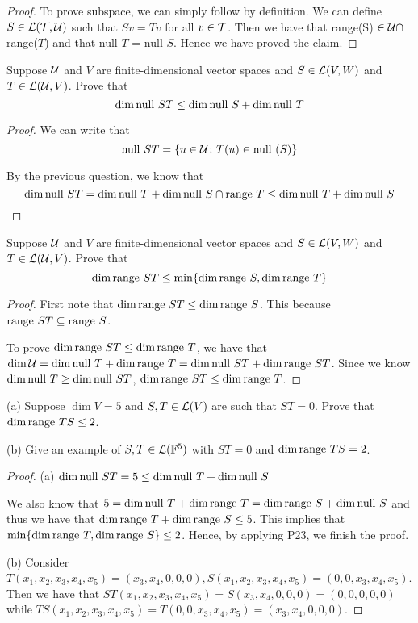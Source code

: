 \documentclass{extarticle}
\begin{document}
\begin{proof}
To prove subspace, we can simply follow by definition. We can define 
\(S \in \mathcal{L}(\mathcal{T}, \mathcal{U})\) such that \(S v = T v\) for all \(v \in \mathcal{T}\). Then 
we have that range(S) \(\in \mathcal{U}  \cap\) range(\(T\)) and that null \(T\) = 
null \(S\). Hence we have proved the claim. 
\end{proof}

\begin{problem}{22}
    Suppose \(\mathcal{U}\) and \(V\) are finite-dimensional vector spaces and \(S 
    \in \mathcal{L}(V, W)\) and \(T \in \mathcal{L}(\mathcal{U}, V)\). Prove that 
    \[\dim \text{null } ST \leq \dim \text{null } S + \dim \text{null } T\] 
\end{problem}

\begin{proof}
We can write that 
\[\text{null } ST = \{u \in \mathcal{U} \colon T(u) \in \text{null } (S)\}\]

By the previous question, we know that 
\[\dim \text{null } ST = \dim \text{null } T + \dim \text{null } S \cap \text{range } T \leq \dim \text{null } T + \dim \text{null } S\]
\end{proof}

\begin{problem}{23}
    Suppose \(\mathcal{U}\) and \(V\) are finite-dimensional vector spaces and \(S \in \mathcal{L}(V, W)\)
    and \(T \in \mathcal{L}(\mathcal{U}, V)\). Prove that 
    \[\dim \text{range } ST \leq \min \{\dim \text{range } S, \dim \text{range } T\}\]
\end{problem}

\begin{proof}
First note that \(\dim \text{range } ST \leq \dim \text{range } S\). This because \(\text{range } ST \subseteq \text{range } S\). 

To prove \(\dim \text{range } ST \leq \dim \text{range } T\), we have that \(\dim \mathcal{U} = \dim \text{null } T 
+ \dim \text{range } T = \dim \text{null } ST + \dim \text{range } ST\). Since we know \(\dim \text{null } T \geq \dim \text{null } 
ST\), \(\dim \text{range } ST \leq \dim \text{range } T\). 
\end{proof}

\begin{problem}{24}
    (a) Suppose \(\dim V = 5\) and \(S, T \in \mathcal{L}(V)\) are such 
    that \(ST = 0\). Prove that \(\dim \text{range } TS \leq 2\). 

    (b) Give an example of \(S, T \in \mathcal{L}(\mathbb{F}^5)\) with \(ST=0\) and \(\dim \text{range } TS = 2\).
\end{problem}


\begin{proof}
(a) \(\dim \text{null } ST = 5 \leq \dim \text{null } T + \dim \text{null } S\)

We also know that  \(5 = \dim \text{null } T + \dim \text{range } T = \dim \text{range } S + \dim \text{null } S\) 
and thus we have that \(\dim \text{range } T + \dim \text{range } S \leq 5\). This implies that \(\min 
\{\dim \text{range } T, \dim \text{range } S\} \leq 2\). Hence, by applying P23, we finish the proof. 

(b) Consider \(T(x_1, x_2, x_3, x_4, x_5) = (x_3, x_4, 0, 0, 0), S(x_1, x_2, x_3, 
x_4, x_5) = (0,0,x_3,x_4, x_5)\). Then we have that \(ST(x_1, x_2, x_3,x_4,x_5)
= S(x_3, x_4, 0,0,0) = (0,0,0,0,0)\) while \(TS(x_1, x_2, x_3, x_4, x_5)
= T(0,0,x_3,x_4, x_5) = (x_3, x_4, 0,0,0)\).
\end{proof}
\end{document}
